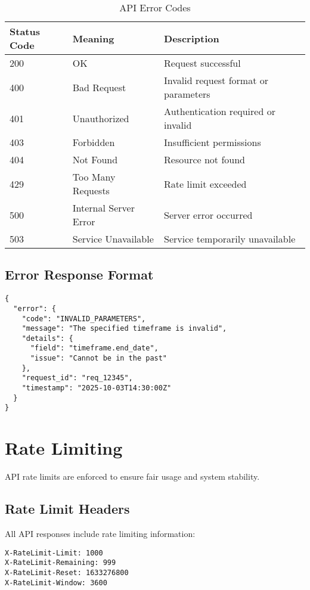 \begin{table}[H]
\centering
\caption{API Error Codes}
\begin{tabular}{|p{2cm}|p{4cm}|p{6cm}|}
\hline
\textbf{Status Code} & \textbf{Meaning} & \textbf{Description} \\
\hline
200 & OK & Request successful \\
\hline
400 & Bad Request & Invalid request format or parameters \\
\hline
401 & Unauthorized & Authentication required or invalid \\
\hline
403 & Forbidden & Insufficient permissions \\
\hline
404 & Not Found & Resource not found \\
\hline
429 & Too Many Requests & Rate limit exceeded \\
\hline
500 & Internal Server Error & Server error occurred \\
\hline
503 & Service Unavailable & Service temporarily unavailable \\
\hline
\end{tabular}
\end{table}

\subsection{Error Response Format}

\begin{verbatim}
{
  "error": {
    "code": "INVALID_PARAMETERS",
    "message": "The specified timeframe is invalid",
    "details": {
      "field": "timeframe.end_date",
      "issue": "Cannot be in the past"
    },
    "request_id": "req_12345",
    "timestamp": "2025-10-03T14:30:00Z"
  }
}
\end{verbatim}

\section{Rate Limiting}

API rate limits are enforced to ensure fair usage and system stability.

\subsection{Rate Limit Headers}

All API responses include rate limiting information:

\begin{verbatim}
X-RateLimit-Limit: 1000
X-RateLimit-Remaining: 999
X-RateLimit-Reset: 1633276800
X-RateLimit-Window: 3600
\end{verbatim}

